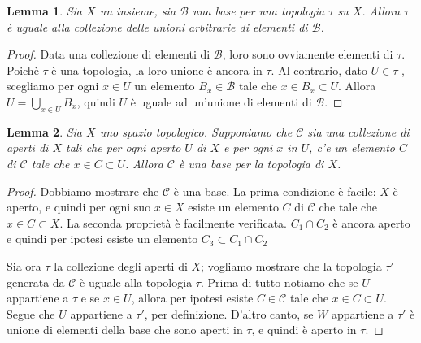 \documentclass[10pt,a4paper]{article}
\theoremstyle{definition}
\theoremstyle{plain}
\newtheorem{lem}{Lemma}
\theoremstyle{remark}
\newtheorem{rem}{Remark}
\theoremstyle{remark}
\newcommand{\C}{\mathcal{C}}
\newcommand{\B}{\mathcal{B}}
\begin{document}
\begin{lem} Sia $X$ un insieme, sia $\B$ una base per una topologia $\tau$ su $X$. Allora $\tau$ è uguale alla collezione delle unioni arbitrarie di elementi di $\B$.
\end{lem}
\begin{proof}
Data una collezione di elementi di $\B$, loro sono ovviamente elementi di $\tau$. Poichè $\tau$ è una topologia, la loro unione è ancora in $\tau$. Al contrario, dato $U \in \tau$ , scegliamo per ogni $x \in U$ un elemento $B_x \in \B$ tale che $x \in B_x \subset U$. Allora $U = \bigcup_{x \in U} B_x$, quindi $U$ è uguale ad un'unione di elementi di $\B$.
\end{proof}

%

\begin{lem}\label{baselem13.2} Sia $X$ uno spazio topologico. Supponiamo che $\C$ sia una collezione di aperti di $X$ tali che per ogni aperto $U$ di $X$ e per ogni $x$ in $U$, c'e un elemento $C$ di $\C$ tale che $x \in C \subset U$. Allora $\C$ è una base per la topologia di $X$. 
\end{lem}

\begin{proof}
Dobbiamo mostrare che $\C$ è una base. La prima condizione è facile: $X$ è aperto, e quindi per ogni suo $x \in X$ esiste un elemento $C$ di $\C$ che tale che $x \in C \subset X$. La seconda proprietà è facilmente verificata. $C_1 \cap C_2$ è ancora aperto e quindi per ipotesi esiste un elemento $C_3 \subset C_1 \cap C_2$

Sia ora $\tau$ la collezione degli aperti di $X$; vogliamo mostrare che la topologia $\tau'$ generata da $\C$ è uguale alla topologia $\tau$. Prima di tutto notiamo che se $U$ appartiene a $\tau$ e se $x \in U$, allora per ipotesi esiste $C \in \C$ tale che $x \in C \subset U$. Segue che $U$ appartiene a $\tau'$, per definizione. D'altro canto, se $W$ appartiene a $\tau'$ è unione di elementi della base che sono aperti in $\tau$, e quindi è aperto in $\tau$.
\end{proof}


\end{document}
